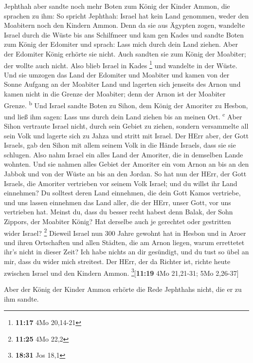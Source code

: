  Jephthah aber sandte noch mehr Boten zum König der
Kinder Ammon,  die sprachen zu ihm: So spricht Jephthah:
Israel hat kein Land genommen, weder den Moabitern noch den Kindern
Ammon.  Denn da sie aus Ägypten zogen, wandelte Israel
durch die Wüste bis ans Schilfmeer und kam gen Kades  und
sandte Boten zum König der Edomiter und sprach: Lass mich durch dein
Land ziehen. Aber der Edomiter König erhörte sie nicht. Auch sandten sie
zum König der Moabiter; der wollte auch nicht. Also blieb Israel in
Kades \footnote{\textbf{11:17} 4Mo 20,14-21}  und
wandelte in der Wüste. Und sie umzogen das Land der Edomiter und
Moabiter und kamen von der Sonne Aufgang an der Moabiter Land und
lagerten sich jenseits des Arnon und kamen nicht in die Grenze der
Moabiter; denn der Arnon ist der Moabiter Grenze. \textsuperscript{b}
 Und Israel sandte Boten zu Sihon, dem König der Amoriter
zu Hesbon, und ließ ihm sagen: Lass uns durch dein Land ziehen bis an
meinen Ort. \textsuperscript{c}  Aber Sihon vertraute
Israel nicht, durch sein Gebiet zu ziehen, sondern versammelte all sein
Volk und lagerte sich zu Jahza und stritt mit Israel. 
Der HErr aber, der Gott Israels, gab den Sihon mit allem seinem Volk in
die Hände Israels, dass sie sie schlugen. Also nahm Israel ein alles
Land der Amoriter, die in demselben Lande wohnten.  Und
sie nahmen alles Gebiet der Amoriter ein vom Arnon an bis an den Jabbok
und von der Wüste an bis an den Jordan.  So hat nun der
HErr, der Gott Israels, die Amoriter vertrieben vor seinem Volk Israel;
und du willst ihr Land einnehmen?  Du solltest deren Land
einnehmen, die dein Gott Kamos vertriebe, und uns lassen einnehmen das
Land aller, die der HErr, unser Gott, vor uns vertrieben hat.
 Meinst du, dass du besser recht habest denn Balak, der
Sohn Zippors, der Moabiter König? Hat derselbe auch je gerechtet oder
gestritten wider Israel? \footnote{\textbf{11:25} 4Mo 22,2}
 Dieweil Israel nun 300 Jahre gewohnt hat in Hesbon und
in Aroer und ihren Ortschaften und allen Städten, die am Arnon liegen,
warum errettetet ihr's nicht in dieser Zeit?  Ich habe
nichts an dir gesündigt, und du tust so übel an mir, dass du wider mich
streitest. Der HErr, der da Richter ist, richte heute zwischen Israel
und den Kindern Ammon. \footnote{\textbf{18:31} Jos 18,1}{[}\textbf{11:19}
4Mo 21,21-31; 5Mo 2,26-37{]}

 Aber der König der Kinder Ammon erhörte die Rede
Jephthahs nicht, die er zu ihm sandte.

